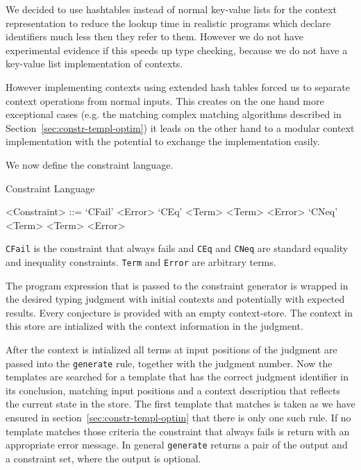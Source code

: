 We decided to use hashtables instead of normal key-value lists for the
context representation to reduce the lookup time in realistic programs
which declare identifiers much less then they refer to them. However
we do not have experimental evidence if this speeds up type checking,
because we do not have a key-value list implementation of contexts.

However implementing contexts using extended hash tables forced us to
separate context operations from normal inputs. This creates on the
one hand more exceptional cases (e.g. the matching complex matching
algorithms described in Section~\ref{sec:constr-templ-optim}) it leads
on the other hand to a modular context implementation with the
potential to exchange the implementation easily.

We now define the constraint language.

\begin{definition}{Constraint Language}
  \begin{grammar}
    <Constraint> ::= `CFail' <Error>
    \alt `CEq' <Term> <Term> <Error>
    \alt `CNeq' <Term> <Term> <Error>
  \end{grammar}
\end{definition}

\verb|CFail| is the constraint that always fails and \verb|CEq| and
\verb|CNeq| are standard equality and inequality
constraints. \verb|Term| and \verb|Error| are arbitrary terms.

The program expression that is passed to the constraint generator is
wrapped in the desired typing judgment with initial contexts and
potentially with expected results. Every conjecture is provided with
an empty context-store. The context in this store are intialized with
the context information in the judgment.

After the context is intialized all terms at input positions of the
judgment are passed into the \verb|generate| rule, together with the
judgment number. Now the templates are searched for a template that has the
correct judgment identifier in its conclusion, matching input
positions and a context description that reflects the current state in
the store. The first template that matches is taken as we have ensured
in section~\ref{sec:constr-templ-optim} that there is only one such
rule. If no template matches those criteria the constraint that always
fails is return with an appropriate error message. In general
\verb|generate| returns a pair of the output and a constraint set,
where the output is optional. 

